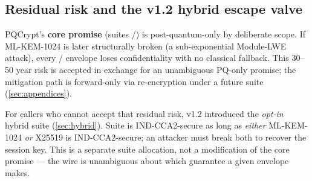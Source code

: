 \subsection*{Residual risk and the v1.2 hybrid escape valve}

PQCrypt's \textbf{core promise} (suites /) is post-quantum-only by deliberate scope. If ML-KEM-1024 is later structurally broken (a sub-exponential Module-LWE attack), every / envelope loses confidentiality with no classical fallback. This 30--50 year risk is accepted in exchange for an unambiguous PQ-only promise; the mitigation path is forward-only via re-encryption under a future suite (\cref{sec:appendices}).

For callers who cannot accept that residual risk, v1.2 introduced the \emph{opt-in} hybrid suite  (\cref{sec:hybrid}). Suite  is IND-CCA2-secure as long as \emph{either} ML-KEM-1024 \emph{or} X25519 is IND-CCA2-secure; an attacker must break both to recover the session key. This is a separate suite allocation, not a modification of the core promise --- the wire is unambiguous about which guarantee a given envelope makes.
